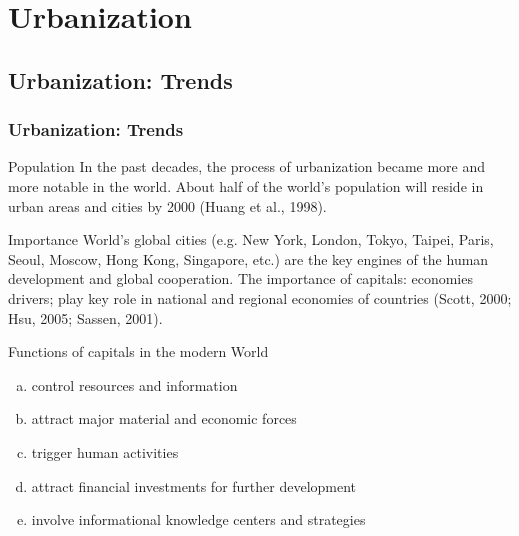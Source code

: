 \documentclass[pdflatex,compress,8pt,
	xcolor={dvipsnames,dvipsnames,svgnames,x11names,table},
	hyperref={colorlinks = true,breaklinks = true, urlcolor = NavyBlue, breaklinks = true}]{beamer}
\begin{document}
\section{Urbanization}

\subsection{Urbanization: Trends}
\begin{frame}\frametitle{Urbanization: Trends}

\begin{alertblock}{Population}
In the past decades, the process of urbanization became more and more notable in the world. About half of the world's population will reside in urban areas and cities by 2000 (Huang et al., 1998).
\end{alertblock}

\begin{block}{Importance}
World's global cities (e.g. New York, London, Tokyo, Taipei, Paris, Seoul, Moscow, Hong Kong, Singapore, etc.) are the key engines of the human development and global cooperation. The importance of capitals: economies drivers; play key role in national and regional economies of countries (Scott, 2000; Hsu, 2005; Sassen, 2001).
\end{block}

\begin{examples}{Functions of capitals in the modern World}
\begin{enumerate}[(a)]
	\item control resources and information
	\item attract major material and economic forces
	\item trigger human activities
	\item attract financial investments for further development
	\item involve informational knowledge centers and strategies
\end{enumerate}
\end{examples}
\end{frame}
\end{document}
